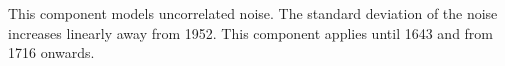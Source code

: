 This component models uncorrelated noise.
The standard deviation of the noise increases linearly away from 1952.
This component applies until 1643 and from 1716 onwards.